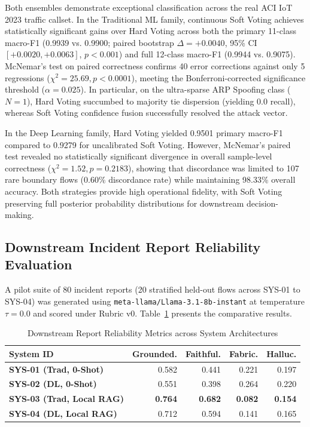 \documentclass[conference]{IEEEtran}
\begin{document}
Both ensembles demonstrate exceptional classification across the real ACI IoT 2023 traffic callset. In the Traditional ML family, continuous Soft Voting achieves statistically significant gains over Hard Voting across both the primary 11-class macro-F1 (0.9939 vs. 0.9900; paired bootstrap $\Delta = +0.0040$, 95\% CI $[+0.0020, +0.0063]$, $p < 0.001$) and full 12-class macro-F1 (0.9944 vs. 0.9075). McNemar's test on paired correctness confirms 40 error corrections against only 5 regressions ($\chi^2 = 25.69, p < 0.0001$), meeting the Bonferroni-corrected significance threshold ($\alpha = 0.025$). In particular, on the ultra-sparse ARP Spoofing class ($N=1$), Hard Voting succumbed to majority tie dispersion (yielding 0.0 recall), whereas Soft Voting confidence fusion successfully resolved the attack vector.

In the Deep Learning family, Hard Voting yielded 0.9501 primary macro-F1 compared to 0.9279 for uncalibrated Soft Voting. However, McNemar's paired test revealed no statistically significant divergence in overall sample-level correctness ($\chi^2 = 1.52, p = 0.2183$), showing that discordance was limited to 107 rare boundary flows (0.60\% discordance rate) while maintaining 98.33\% overall accuracy. Both strategies provide high operational fidelity, with Soft Voting preserving full posterior probability distributions for downstream decision-making.

\subsection{Downstream Incident Report Reliability Evaluation}
A pilot suite of 80 incident reports (20 stratified held-out flows across SYS-01 to SYS-04) was generated using \texttt{meta-llama/Llama-3.1-8b-instant} at temperature $\tau=0.0$ and scored under Rubric v0. Table~\ref{tab:eval_metrics} presents the comparative results.

\begin{table}[htbp]
\caption{Downstream Report Reliability Metrics across System Architectures}
\begin{center}
\begin{tabularx}{\columnwidth}{lrrrr}
\toprule
\textbf{System ID} & \textbf{Grounded.} & \textbf{Faithful.} & \textbf{Fabric.} & \textbf{Halluc.} \\
\midrule
\textbf{SYS-01 (Trad, 0-Shot)} & 0.582 & 0.441 & 0.221 & 0.197 \\
\textbf{SYS-02 (DL, 0-Shot)} & 0.551 & 0.398 & 0.264 & 0.220 \\
\textbf{SYS-03 (Trad, Local RAG)} & \textbf{0.764} & \textbf{0.682} & \textbf{0.082} & \textbf{0.154} \\
\textbf{SYS-04 (DL, Local RAG)} & 0.712 & 0.594 & 0.141 & 0.165 \\
\bottomrule
\end{tabularx}
\label{tab:eval_metrics}
\end{center}
\end{table}
\end{document}
